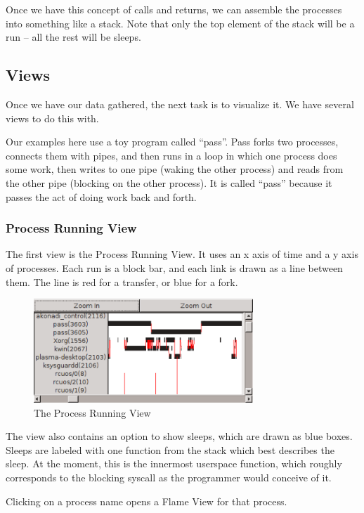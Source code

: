 \documentclass[10pt]{article}
\begin{document}
Once we have this concept of calls and returns, we can assemble the processes into something like a stack.  Note that only the top element of the stack will be a run -- all the rest will be sleeps.

\subsection{Views}

Once we have our data gathered, the next task is to visualize it.  We have several views to do this with.

Our examples here use a toy program called ``pass''.  Pass forks two processes, connects them with pipes, and then runs in a loop in which one process does some work, then writes to one pipe (waking the other process) and reads from the other pipe (blocking on the other process).  It is called ``pass'' because it passes the act of doing work back and forth.

\subsubsection{Process Running View}

The first view is the Process Running View.  It uses an x axis of time and a y axis of processes.  Each run is a block bar, and each link is drawn as a line between them.  The line is red for a transfer, or blue for a fork.

\begin{figure}[h]
\includegraphics[width=3.25in]{screenshot}
\caption{The Process Running View}
\end{figure}

The view also contains an option to show sleeps, which are drawn as blue boxes.  Sleeps are labeled with one function from the stack which best describes the sleep.  At the moment, this is the innermost userspace function, which roughly corresponds to the blocking syscall as the programmer would conceive of it.

Clicking on a process name opens a Flame View for that process.
\end{document}
